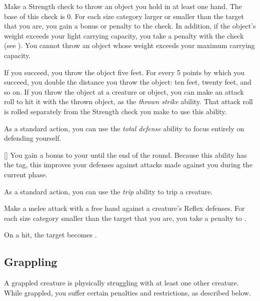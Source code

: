         \begin{freeability}{}
            Make a Strength check to throw an object you hold in at least one hand.
            The base  of this check is 0.
            For each size category larger or smaller than the target that you are, you gain a  bonus or penalty to the check.
            In addition, if the object's weight exceeds your light carrying capacity, you take a  penalty with the check (see ).
            You cannot throw an object whose weight exceeds your maximum carrying capacity.

            If you succeed, you throw the object five feet.
            For every 5 points by which you succeed, you double the distance you throw the object: ten feet, twenty feet, and so on.
            If you throw the object at a creature or object, you can make an attack roll to hit it with the thrown object, as the \textit{thrown strike} ability.
            That attack roll is rolled separately from the Strength check you make to use this ability.
        \end{freeability}

         As a standard action, you can use the \textit{total defense} ability to focus entirely on defending yourself.

        \begin{freeability}{}[]
            You gain a  bonus to your  until the end of the round.
            Because this ability has the  tag, this improves your defenses against attacks made against you during the current phase.
        \end{freeability}

         As a standard action, you can use the \textit{trip} ability to trip a creature.

        \begin{freeability}{}
            Make a melee attack with a free hand against a creature's Reflex defenses.
            For each size category smaller than the target that you are, you take a  penalty to .

            On a hit, the target becomes \prone.
        \end{freeability}

    \subsection{Grappling}\label{Grappling}
        A grappled creature is physically struggling with at least one other creature.
        While grappled, you suffer certain penalties and restrictions, as described below.

